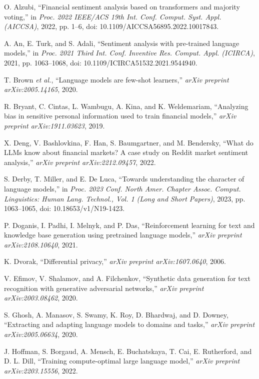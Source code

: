 \documentclass[a4paper,10pt]{article}
\begin{document}
\begin{thebibliography}{1}

O. Alzubi, ``Financial sentiment analysis based on transformers and majority voting,'' in \emph{Proc. 2022 IEEE/ACS 19th Int. Conf. Comput. Syst. Appl. (AICCSA)}, 2022, pp. 1--6, doi: 10.1109/AICCSA56895.2022.10017843.

A. An, E. Turk, and S. Adali, ``Sentiment analysis with pre-trained language models,'' in \emph{Proc. 2021 Third Int. Conf. Inventive Res. Comput. Appl. (ICIRCA)}, 2021, pp. 1063--1068, doi: 10.1109/ICIRCA51532.2021.9544940.

T. Brown \emph{et al.}, ``Language models are few-shot learners,'' \emph{arXiv preprint arXiv:2005.14165}, 2020.

R. Bryant, C. Cintas, L. Wambugu, A. Kina, and K. Weldemariam, ``Analyzing bias in sensitive personal information used to train financial models,'' \emph{arXiv preprint arXiv:1911.03623}, 2019.

X. Deng, V. Bashlovkina, F. Han, S. Baumgartner, and M. Bendersky, ``What do LLMs know about financial markets? A case study on Reddit market sentiment analysis,'' \emph{arXiv preprint arXiv:2212.09457}, 2022.

S. Derby, T. Miller, and E. De Luca, ``Towards understanding the character of language models,'' in \emph{Proc. 2023 Conf. North Amer. Chapter Assoc. Comput. Linguistics: Human Lang. Technol., Vol. 1 (Long and Short Papers)}, 2023, pp. 1063--1065, doi: 10.18653/v1/N19-1423.

P. Doganis, I. Padhi, I. Melnyk, and P. Das, ``Reinforcement learning for text and knowledge base generation using pretrained language models,'' \emph{arXiv preprint arXiv:2108.10640}, 2021.

K. Dvorak, ``Differential privacy,'' \emph{arXiv preprint arXiv:1607.0640}, 2006.

V. Efimov, V. Shalamov, and A. Filchenkov, ``Synthetic data generation for text recognition with generative adversarial networks,'' \emph{arXiv preprint arXiv:2003.08462}, 2020.

S. Ghosh, A. Manasov, S. Swamy, K. Roy, D. Bhardwaj, and D. Downey, ``Extracting and adapting language models to domains and tasks,'' \emph{arXiv preprint arXiv:2005.06634}, 2020.

J. Hoffman, S. Borgaud, A. Mensch, E. Buchatskaya, T. Cai, E. Rutherford, and D. L. Dill, ``Training compute-optimal large language model,'' \emph{arXiv preprint arXiv:2203.15556}, 2022.


\end{thebibliography}
\end{document}
